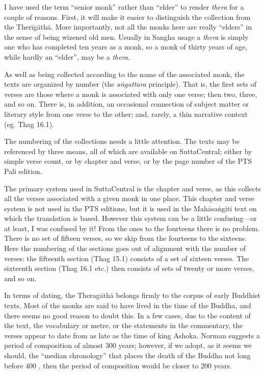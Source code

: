 \documentclass[10pt, openany]{book}
\begin{document}
I have used the term “senior monk” rather than “elder” to render \emph{thera} for a couple of reasons. First, it will make it easier to distinguish the collection from the Therīgāthā. More importantly, not all the monks here are really “elders” in the sense of being wizened old men. Usually in Sangha usage a \emph{thera} is simply one who has completed ten years as a monk, so a monk of thirty years of age, while hardly an “elder”, may be a \emph{thera}.

As well as being collected according to the name of the associated monk, the texts are organized by number (the \emph{aṅguttara} principle). That is, the first sets of verses are those where a monk is associated with only one verse; then two, three, and so on. There is, in addition, an occasional connection of subject matter or literary style from one verse to the other; and, rarely, a thin narrative context (eg. Thag 16.1).

The numbering of the collections needs a little attention. The texts may be referenced by three means, all of which are available on SuttaCentral; either by simple verse count, or by chapter and verse, or by the page number of the PTS Pali edition.

The primary system used in SuttaCentral is the chapter and verse, as this collects all the verses associated with a given monk in one place. This chapter and verse system is not used in the PTS editions, but it is used in the Mahāsaṅgīti text on which the translation is based. However this system can be a little confusing—or at least, I was confused by it! From the ones to the fourteens there is no problem. There is no set of fifteen verses, so we skip from the fourteens to the sixteens. Here the numbering of the sections goes out of alignment with the number of verses: the fifteenth section (Thag 15.1) consists of a set of sixteen verses. The sixteenth section (Thag 16.1 etc.) then consists of sets of twenty or more verses, and so on.

In terms of dating, the Thera\-gāthā belongs firmly to the corpus of early Buddhist texts. Most of the monks are said to have lived in the time of the Buddha, and there seems no good reason to doubt this. In a few cases, due to the content of the text, the vocabulary or metre, or the statements in the commentary, the verses appear to date from as late as the time of king Ashoka. Norman suggests a period of composition of almost 300 years; however, if we adopt, as it seems we should, the “median chronology” that places the death of the Buddha not long before 400 , then the period of composition would be closer to 200 years.
\end{document}

